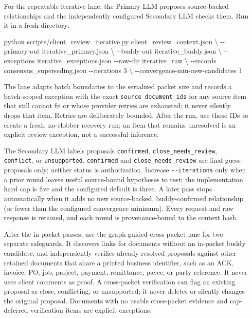\documentclass[
]{article}
\newenvironment{Shaded}{}{}
\newcommand{\AttributeTok}[1]{\textcolor[rgb]{0.49,0.56,0.16}{#1}}
\newcommand{\DataTypeTok}[1]{\textcolor[rgb]{0.56,0.13,0.00}{#1}}
\newcommand{\ExtensionTok}[1]{#1}
\newcommand{\NormalTok}[1]{#1}
\begin{document}
For the repeatable iterative lane, the Primary LLM proposes
source-backed relationships and the independently configured Secondary
LLM checks them. Run it in a fresh directory:

\begin{Shaded}
\begin{Highlighting}[]
\ExtensionTok{python}\NormalTok{ scripts/client\_review\_iterative.py client\_review\_context.json }\DataTypeTok{\textbackslash{}}
  \AttributeTok{{-}{-}primary{-}out}\NormalTok{ iterative\_primary.json }\DataTypeTok{\textbackslash{}}
  \AttributeTok{{-}{-}buddy{-}out}\NormalTok{ iterative\_buddy.json }\DataTypeTok{\textbackslash{}}
  \AttributeTok{{-}{-}exceptions}\NormalTok{ iterative\_exceptions.json }\AttributeTok{{-}{-}raw{-}dir}\NormalTok{ iterative\_raw }\DataTypeTok{\textbackslash{}}
  \AttributeTok{{-}{-}records}\NormalTok{ consensus\_superseding.json }\AttributeTok{{-}{-}iterations}\NormalTok{ 3 }\DataTypeTok{\textbackslash{}}
  \AttributeTok{{-}{-}convergence{-}min{-}new{-}candidates}\NormalTok{ 1}
\end{Highlighting}
\end{Shaded}

The lane adapts batch boundaries to the serialized packet size and
records a batch-scoped exception with the exact
\texttt{source\_\allowbreak{}document\_\allowbreak{}ids} for any source
item that still cannot fit or whose provider retries are exhausted; it
never silently drops that item. Retries are deliberately bounded. After
the run, use those IDs to create a fresh, no-clobber recovery run; an
item that remains unresolved is an explicit review exception, not a
successful inference.

The Secondary LLM labels proposals \texttt{confirmed},
\texttt{close\_\allowbreak{}needs\_\allowbreak{}review},
\texttt{conflict}, or \texttt{unsupported}. \texttt{confirmed} and
\texttt{close\_\allowbreak{}needs\_\allowbreak{}review} are final-guess
proposals only; neither status is authorization. Increase
\texttt{-\/-iterations} only when a prior round leaves useful
source-bound hypotheses to test; the implementation hard cap is five and
the configured default is three. A later pass stops automatically when
it adds no new source-backed, buddy-confirmed relationship (or fewer
than the configured convergence minimum). Every request and raw response
is retained, and each round is provenance-bound to the context hash.

After the in-packet passes, use the graph-guided cross-packet lane for
two separate safeguards. It discovers links for documents without an
in-packet buddy candidate, and independently verifies already-resolved
proposals against other retained documents that share a printed business
identifier, such as an ACK, invoice, PO, job, project, payment,
remittance, payee, or party reference. It never uses client comments as
proof. A cross-packet verification can flag an existing proposal as
close, conflicting, or unsupported; it never deletes or silently changes
the original proposal. Documents with no usable cross-packet evidence
and cap-deferred verification items are explicit exceptions:
\end{document}
